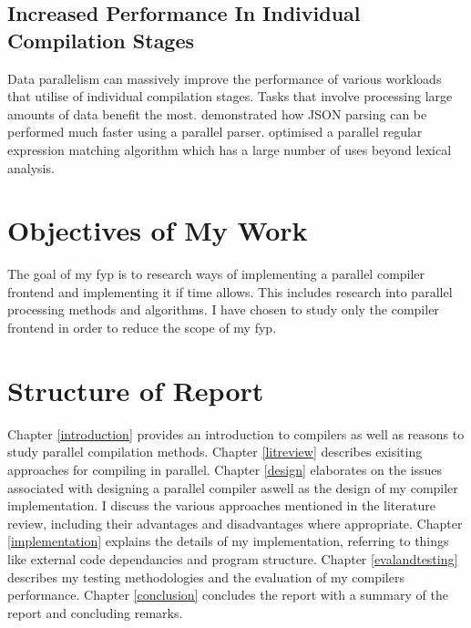 \subsection{Increased Performance In Individual Compilation Stages}

Data parallelism can massively improve the performance of various workloads that
utilise of individual compilation stages. Tasks that involve processing large
amounts of data benefit the most. \cite{barenghi_parallel_2015} demonstrated
how JSON parsing can be performed much faster using a parallel parser.
\cite{mytkowicz_data-parallel_2014} optimised a parallel regular expression
matching algorithm which has a large number of uses beyond lexical analysis.

\section{Objectives of My Work}

The goal of my \gls{fyp} is to research ways of implementing a parallel compiler
frontend and implementing it if time allows. This includes research into
parallel processing methods and algorithms. I have chosen to study only the
compiler frontend in order to reduce the scope of my \gls{fyp}.

\section{Structure of Report}

Chapter \ref{introduction} provides an introduction to compilers as well as
reasons to study parallel compilation methods.
\newline \newline
Chapter \ref{litreview} describes exisiting approaches for compiling
in parallel.
\newline \newline
Chapter \ref{design} elaborates on the issues associated with designing a
parallel compiler aswell as the design of my compiler implementation. I discuss
the various approaches mentioned in the literature review, including their
advantages and disadvantages where appropriate.
\newline \newline
Chapter \ref{implementation} explains the details of my implementation,
referring to things like external code dependancies and program structure.
\newline \newline
Chapter \ref{evalandtesting} describes my testing methodologies and the evaluation of my compilers performance.
\newline \newline
Chapter \ref{conclusion} concludes the report with a summary of the report and
concluding remarks.
